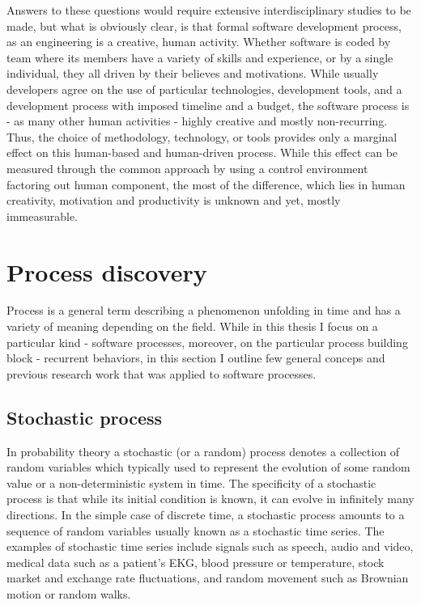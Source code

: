 Answers to these questions would require extensive interdisciplinary studies to be made, 
but what is obviously clear, is that formal software development process, as an engineering 
is a creative, human activity. 
Whether software is coded 
by team where its members have a variety of skills and experience, or by a single individual,
they all driven by their believes and motivations. While usually developers agree on the use of 
particular technologies, development tools, and a development process with imposed timeline and 
a budget, the software process is - as many other human activities - highly creative and mostly 
non-recurring. Thus, the choice of methodology, technology, or tools provides only a marginal 
effect on this human-based and human-driven process. While this effect can be measured through 
the common approach by using a control environment factoring out human component, the most of 
the difference, which lies in human creativity, motivation and productivity is unknown and yet, 
mostly immeasurable.

\section{Process discovery}\label{process.discovery} 
Process is a general term describing a phenomenon unfolding in time and has a variety of meaning depending
on the field. While in this thesis I focus on a particular kind - software processes, moreover, on the particular process 
building block - recurrent behaviors, in this section I outline few general conceps and previous research work that 
was applied to software processes.

\subsection{Stochastic process}
In probability theory a stochastic (or a random) process denotes a collection of random variables which typically used
to represent the evolution of some random value or a non-deterministic system in time. The specificity of a stochastic 
process is that while its initial condition is known, it can evolve in infinitely many directions. 
In the simple case of discrete time, a stochastic process amounts to a sequence of random variables usually known as 
a stochastic time series. 
The examples of stochastic time series include signals such as speech, audio and video, medical data such as a 
patient's EKG, blood pressure or temperature, stock market and exchange rate fluctuations, and random movement 
such as Brownian motion or random walks.

